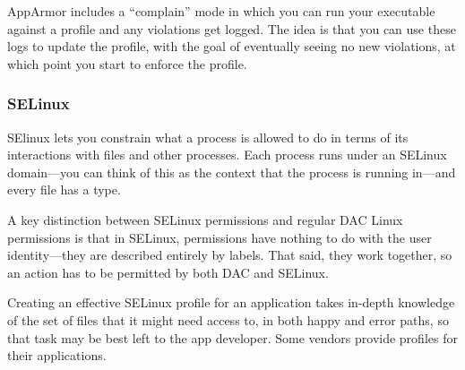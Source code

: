 AppArmor includes a “complain” mode in which you can run your executable against a profile and any violations get logged. The idea is that you can use these logs to update the profile, with the goal of eventually seeing no new violations, at which point you start to enforce the profile.

\subsubsection{\textbf{SELinux}}
SElinux lets you constrain what a process is allowed to do in terms of its interactions with files and other processes. Each process runs under an SELinux domain—you can think of this as the context that the process is running in—and every file has a type.

A key distinction between SELinux permissions and regular DAC Linux permissions is that in SELinux, permissions have nothing to do with the user identity—they are described entirely by labels. That said, they work together, so an action has to be permitted by both DAC and SELinux.

Creating an effective SELinux profile for an application takes in-depth knowledge of the set of files that it might need access to, in both happy and error paths, so that task may be best left to the app developer. Some vendors provide profiles for their applications.



